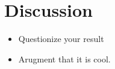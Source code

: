 \section{Discussion}
\begin{itemize}
\item Questionize your result
\item Arugment that it is cool.
\end{itemize}